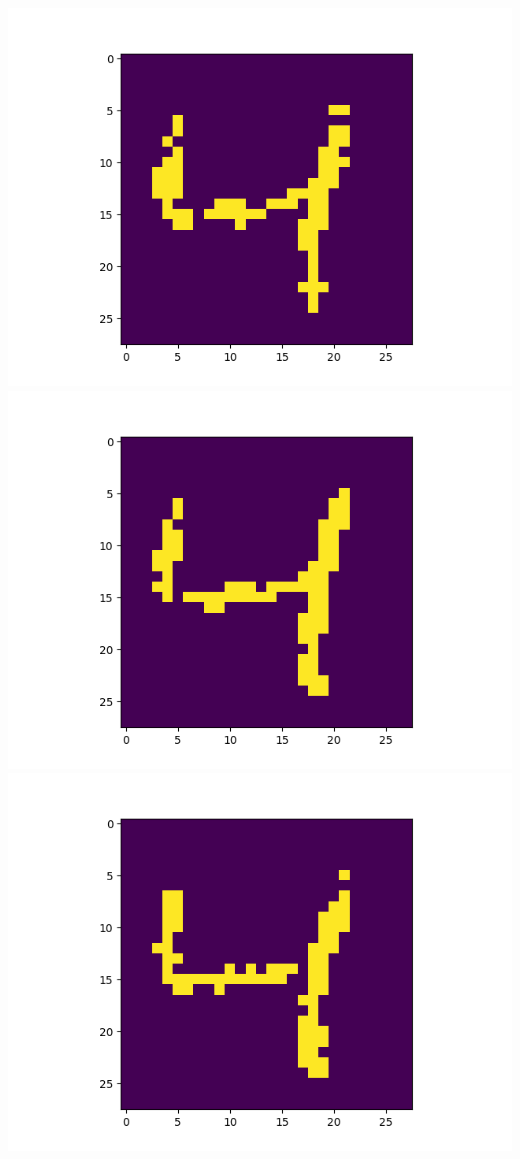 \includegraphics[scale=0.2]{./bilder/comparison/prob/37}
\includegraphics[scale=0.2]{./bilder/comparison/prob/38}
\includegraphics[scale=0.2]{./bilder/comparison/prob/39}
